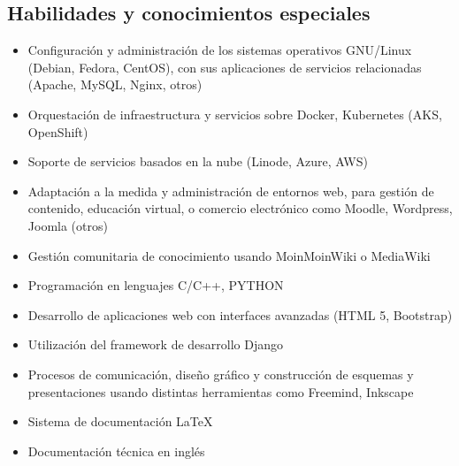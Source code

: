 \documentclass[overlapped,line,final]{res}
\begin{document}
\begin{resume}
\section{\sc Habilidades y conocimientos especiales}
\vspace{0.5cm}
\begin{itemize}
	\item Configuración y administración de los sistemas operativos GNU/Linux (Debian, Fedora, CentOS), con sus aplicaciones de servicios relacionadas (Apache, MySQL, Nginx, otros)
	\item Orquestación de infraestructura y servicios sobre Docker, Kubernetes (AKS, OpenShift)
	\item Soporte de servicios basados en la nube (Linode, Azure, AWS) 
	\item Adaptación a la medida y administración de entornos web, para gestión de contenido, educación virtual, o comercio electrónico como Moodle, Wordpress, Joomla (otros)
	\item Gestión comunitaria de conocimiento usando MoinMoinWiki o MediaWiki
	\item Programación en lenguajes C/C++, PYTHON
	\item Desarrollo de aplicaciones web con interfaces avanzadas (HTML 5, Bootstrap)
	\item Utilización del framework de desarrollo Django
 	\item Procesos de comunicación, diseño gráfico y construcción de esquemas y presentaciones usando distintas herramientas como Freemind, Inkscape
	\item Sistema de documentación \LaTeX  	
	\item Documentación técnica en inglés

\end{itemize}


\end{resume}
\end{document}
